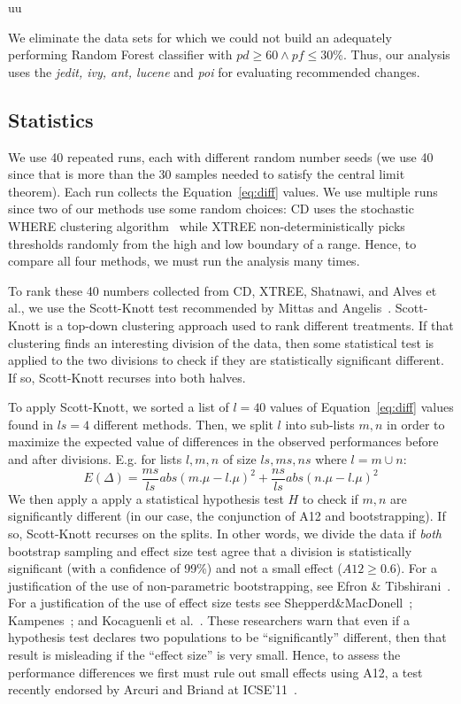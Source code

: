 uu \documentclass[final,twocolumn,5p]{elsarticle}
\newcommand{\eq}[1]{Equation~\ref{eq:#1}}
\theoremstyle{break}
\begin{document}
\begin{itemize}
We eliminate the data sets for which we could not build an adequately performing Random Forest classifier with $\mathit{pd}\ge 60 \wedge \mathit{pf} \le 30$\%. Thus, our analysis uses the {\em jedit, ivy, ant, lucene} and {\em poi} for evaluating recommended changes.




\subsection{Statistics}


We use 40 repeated runs, each with different random number seeds (we use 40 since that is  more than the 30 samples  needed to satisfy the central limit theorem). Each run collects the \eq{diff} values.
We use multiple runs since two of our methods use some random choices: CD uses the  stochastic WHERE clustering algorithm~\cite{localvsglobal}
while XTREE non-deterministically picks thresholds randomly from
the high and low boundary of a range. 
 Hence, to compare all
four methods, we must run the analysis many times. 





To rank these 40 numbers collected from CD, XTREE, Shatnawi, and Alves et al., we use the Scott-Knott test recommended by Mittas and Angelis~\cite{mittas13}. 
Scott-Knott is a top-down clustering approach used to rank different
treatments. If that clustering finds an interesting division of the data, then
some statistical test is applied to the two divisions to check if they
are statistically significant different. If so, Scott-Knott recurses
into both halves.

To  apply Scott-Knott,
  we
sorted a list of  $l=40$ values of \eq{diff} values found in  $ls=4$ different methods. 
Then, we split $l$ into sub-lists $m,n$ in order to maximize the expected value of differences in the observed performances before and after divisions. E.g. for lists $l,m,n$ of size $ls,ms,ns$ where $l=m\cup n$: \[E(\Delta)=\frac{ms}{ls}abs(m.\mu - l.\mu)^2 + \frac{ns}{ls}abs(n.\mu - l.\mu)^2\]
We then apply a apply a statistical hypothesis test $H$ to check
if $m,n$ are significantly different  (in our case, the conjunction of A12 and bootstrapping). If so, Scott-Knott recurses on the splits. In other words, we divide the data if \textit{both} bootstrap sampling and effect size test agree that a division is statistically significant (with a confidence of 99\%) and not a small effect ($A12 \ge 0.6$).
For a justification of the use of non-parametric bootstrapping, see Efron \& Tibshirani~\cite[p220-223]{efron93}. For a justification of the use of effect size tests see Shepperd\&MacDonell~\cite{shepperd12a}; Kampenes~\cite{kampenes07}; and Kocaguenli et al.~\cite{Kocaguneli2013:ep}. These researchers warn that even if a hypothesis test declares two populations to be ``significantly'' different, then that result is misleading if the ``effect size'' is very small. Hence, to assess the performance differences we first must rule out small effects using A12, a test   recently endorsed by Arcuri and Briand at ICSE'11~\cite{arcuri11}.


\end{itemize}
\end{document}
